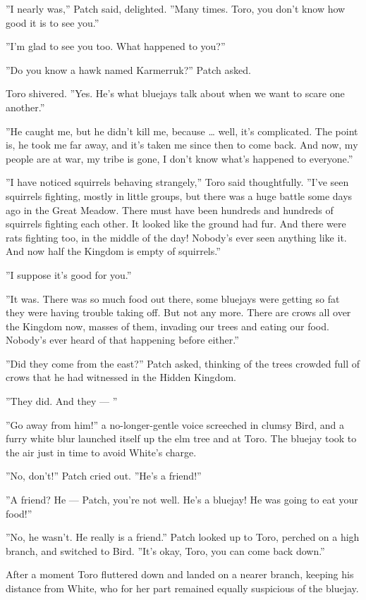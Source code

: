 \documentclass[12pt]{book}
\begin{document}
''I nearly was,'' Patch said, delighted. ''Many times. Toro, you don't know how good it is to see you.''

''I'm glad to see you too. What happened to you?''

''Do you know a hawk named Karmerruk?'' Patch asked.

Toro shivered. ''Yes. He's what bluejays talk about when we want to scare one another.''

''He caught me, but he didn't kill me, because \ldots{}
well, it's complicated. The point is, he took me far away, and it's taken me since then to come back. And now, my people are at war, my tribe is gone, I don't know what's happened to everyone.''

''I have noticed squirrels behaving strangely,'' Toro said thoughtfully. ''I've seen squirrels fighting, mostly in little groups, but there was a huge battle some days ago in the Great Meadow. There must have been hundreds and hundreds of squirrels fighting each other. It looked like the ground had fur. And there were rats fighting too, in the middle of the day! Nobody's ever seen anything like it. And now half the Kingdom is empty of squirrels.''

''I suppose it's good for you.''

''It was. There was so much food out there, some bluejays were getting so fat they were having trouble taking off. But not any more. There are crows all over the Kingdom now, masses of them, invading our trees and eating our food. Nobody's ever heard of that happening before either.''

''Did they come from the east?'' Patch asked, thinking of the trees crowded full of crows that he had witnessed in the Hidden Kingdom.

''They did. And they ---
''

''Go away from him!'' a no-longer-gentle voice screeched in clumsy Bird, and a furry white blur launched itself up the elm tree and at Toro. The bluejay took to the air just in time to avoid White's charge.

''No, don't!'' Patch cried out. ''He's a friend!''

''A friend? He ---
Patch, you're not well. He's a bluejay! He was going to eat your food!''

''No, he wasn't. He really is a friend.'' Patch looked up to Toro, perched on a high branch, and switched to Bird. ''It's okay, Toro, you can come back down.''

After a moment Toro fluttered down and landed on a nearer branch, keeping his distance from White, who for her part remained equally suspicious of the bluejay.
\end{document}
